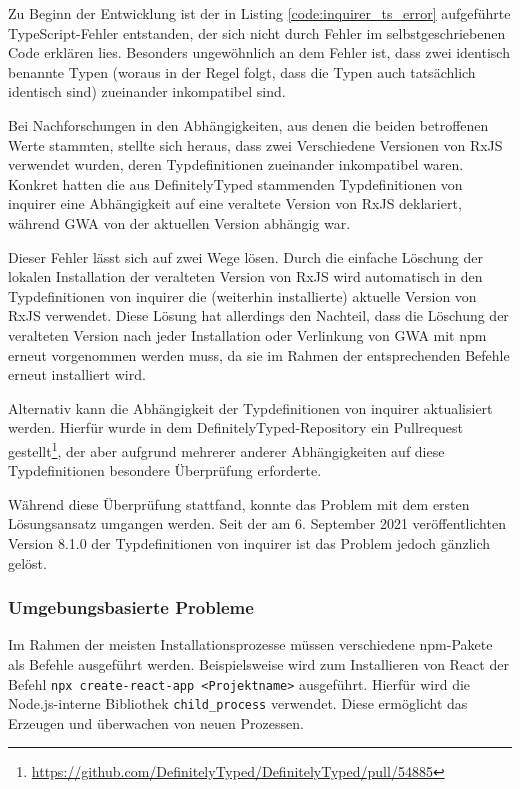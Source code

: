 Zu Beginn der Entwicklung ist der in Listing \ref{code:inquirer_ts_error} aufgeführte TypeScript-Fehler entstanden, der sich nicht durch Fehler im selbstgeschriebenen Code erklären lies. Besonders ungewöhnlich an dem Fehler ist, dass zwei identisch benannte Typen (woraus in der Regel folgt, dass die Typen auch tatsächlich identisch sind) zueinander inkompatibel sind.

Bei Nachforschungen in den Abhängigkeiten, aus denen die beiden betroffenen Werte stammten, stellte sich heraus, dass zwei Verschiedene Versionen von RxJS verwendet wurden, deren Typdefinitionen zueinander inkompatibel waren. Konkret hatten die aus DefinitelyTyped stammenden Typdefinitionen von inquirer eine Abhängigkeit auf eine veraltete Version von RxJS deklariert, während \gls{GWA} von der aktuellen Version abhängig war.

Dieser Fehler lässt sich auf zwei Wege lösen. Durch die einfache Löschung der lokalen Installation der veralteten Version von RxJS wird automatisch in den Typdefinitionen von inquirer die (weiterhin installierte) aktuelle Version von RxJS verwendet. Diese Lösung hat allerdings den Nachteil, dass die Löschung der veralteten Version nach jeder Installation oder Verlinkung von \gls{GWA} mit \gls{npm} erneut vorgenommen werden muss, da sie im Rahmen der entsprechenden Befehle erneut installiert wird.

Alternativ kann die Abhängigkeit der Typdefinitionen von inquirer aktualisiert werden. Hierfür wurde in dem DefinitelyTyped-Repository ein Pullrequest gestellt\footnote{\url{https://github.com/DefinitelyTyped/DefinitelyTyped/pull/54885}}, der aber aufgrund mehrerer anderer Abhängigkeiten auf diese Typdefinitionen besondere Überprüfung erforderte.

Während diese Überprüfung stattfand, konnte das Problem mit dem ersten Lösungsansatz umgangen werden. Seit der am 6. September 2021 veröffentlichten Version 8.1.0 der Typdefinitionen von inquirer ist das Problem jedoch gänzlich gelöst.

\subsubsection{Umgebungsbasierte Probleme}
Im Rahmen der meisten Installationsprozesse müssen verschiedene npm-Pakete als Befehle ausgeführt werden. Beispielsweise wird zum Installieren von React der Befehl \verb/npx create-react-app <Projektname>/ ausgeführt. Hierfür wird die Node.js-interne Bibliothek \verb/child_process/ verwendet. Diese ermöglicht das Erzeugen und überwachen von neuen Prozessen.

